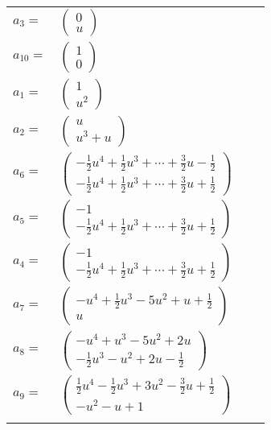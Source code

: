 \documentclass[1p]{elsarticle_modified}
\theoremstyle{definition}
\begin{document}
\begin{tabular}{m{7pt} m{180pt} m{7pt} m{180pt} }
\flushright $a_{3}=$&$\begin{pmatrix}0\\u\end{pmatrix}$ \\
\flushright $a_{10}=$&$\begin{pmatrix}1\\0\end{pmatrix}$ \\
\flushright $a_{1}=$&$\begin{pmatrix}1\\u^2\end{pmatrix}$ \\
\flushright $a_{2}=$&$\begin{pmatrix}u\\u^3+u\end{pmatrix}$ \\
\flushright $a_{6}=$&$\begin{pmatrix}-\frac{1}{2} u^4+\frac{1}{2} u^3+\cdots+\frac{3}{2} u-\frac{1}{2}\\-\frac{1}{2} u^4+\frac{1}{2} u^3+\cdots+\frac{3}{2} u+\frac{1}{2}\end{pmatrix}$ \\
\flushright $a_{5}=$&$\begin{pmatrix}-1\\-\frac{1}{2} u^4+\frac{1}{2} u^3+\cdots+\frac{3}{2} u+\frac{1}{2}\end{pmatrix}$ \\
\flushright $a_{4}=$&$\begin{pmatrix}-1\\-\frac{1}{2} u^4+\frac{1}{2} u^3+\cdots+\frac{3}{2} u+\frac{1}{2}\end{pmatrix}$ \\
\flushright $a_{7}=$&$\begin{pmatrix}- u^4+\frac{1}{2} u^3-5 u^2+u+\frac{1}{2}\\u\end{pmatrix}$ \\
\flushright $a_{8}=$&$\begin{pmatrix}- u^4+u^3-5 u^2+2 u\\-\frac{1}{2} u^3- u^2+2 u-\frac{1}{2}\end{pmatrix}$ \\
\flushright $a_{9}=$&$\begin{pmatrix}\frac{1}{2} u^4-\frac{1}{2} u^3+3 u^2-\frac{3}{2} u+\frac{1}{2}\\- u^2- u+1\end{pmatrix}$\\&\end{tabular}
\end{document}
